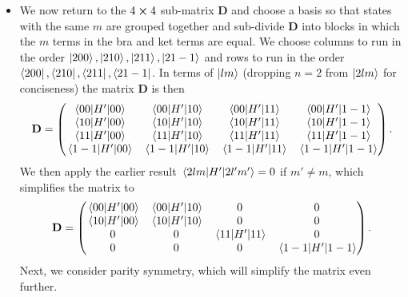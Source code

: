 \documentclass[11pt, a4paper]{article}
\newcommand{\mat}[1]{\mathbf{#1}} %
\begin{document}
\begin{itemize}
	
	\item We now return to the $ 4 \cross 4 $ sub-matrix $ \mat{D} $ and choose a basis so that states with the same $ m $ are grouped together and sub-divide $ \mat{D} $ into blocks in which the $ m $ terms in the bra and ket terms are equal. We choose columns to run in the order $ \ket{200}, \ket{210}, \ket{211}, \ket{21-1} $ and rows to run in the order $ \bra{200}, \bra{210}, \bra{211}, \bra{21-1} $. In terms of $ \ket{lm} $ (dropping $ n = 2 $ from $ \ket{2lm} $ for conciseness) the matrix $ \mat{D} $ is then
	\begin{equation*}
		\mat{D} =
		\begin{pmatrix}
			\mel{00}{H'}{00} & \mel{00}{H'}{10} & \mel{00}{H'}{11} & \mel{00}{H'}{1-1}\\
			\mel{10}{H'}{00} & \mel{10}{H'}{10} & \mel{10}{H'}{11} & \mel{10}{H'}{1-1}\\
			\mel{11}{H'}{00} & \mel{11}{H'}{10} & \mel{11}{H'}{11} & \mel{11}{H'}{1-1}\\
			\mel{1-1}{H'}{00} & \mel{1-1}{H'}{10} & \mel{1-1}{H'}{11} & \mel{1-1}{H'}{1-1}
		\end{pmatrix}.
	\end{equation*}
	We then apply the earlier result $ \mel{2lm}{H'}{2l'm'} = 0 $ if  $	m' \neq m  $, which simplifies the matrix to
	\begin{equation*}
		\mat{D} =
		\begin{pmatrix}
			\mel{00}{H'}{00} & \mel{00}{H'}{10} & 0 & 0\\
			\mel{10}{H'}{00} & \mel{10}{H'}{10} & 0 & 0\\
			0 & 0 & \mel{11}{H'}{11} & 0 \\
			0 & 0 & 0 & \mel{1-1}{H'}{1-1}
		\end{pmatrix}.
	\end{equation*}
	Next, we consider parity symmetry, which will simplify the matrix even further.
\end{itemize}
\end{document}
